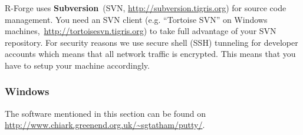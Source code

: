 \documentclass[a4paper]{article}
\newcommand{\proglang}[1]{\textsf{#1}}
\begin{document}
\proglang{R}-Forge uses \textbf{Subversion}~(SVN,
\url{http://subversion.tigris.org}) for source code management.
You need an SVN client (e.g. ``Tortoise SVN'' on
Windows machines,~\url{http://tortoisesvn.tigris.org}) to take full
advantage of your SVN repository. For security
reasons we use secure shell (SSH) tunneling for
developer accounts which means that all network traffic is
encrypted. This means that you have to setup your machine
accordingly.

\subsubsection{Windows}

The software mentioned in this section can be found
on\newline
\url{http://www.chiark.greenend.org.uk/~sgtatham/putty/}.
\end{document}
